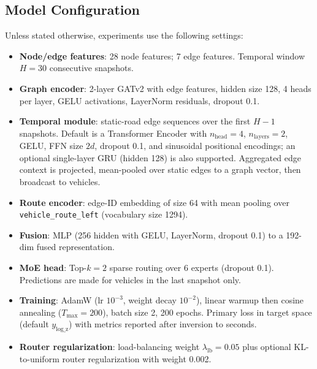 \subsection{Model Configuration}
Unless stated otherwise, experiments use the following settings:
\begin{itemize}
    \item \textbf{Node/edge features}: 28 node features; 7 edge features. Temporal window $H{=}30$ consecutive snapshots.
    \item \textbf{Graph encoder}: 2-layer GATv2 with edge features, hidden size 128, 4 heads per layer, GELU activations, LayerNorm residuals, dropout 0.1.
    \item \textbf{Temporal module}: static-road edge sequences over the first $H{-}1$ snapshots. Default is a Transformer Encoder with $n_\text{head}{=}4$, $n_\text{layers}{=}2$, GELU, FFN size $2d$, dropout 0.1, and sinusoidal positional encodings; an optional single-layer GRU (hidden 128) is also supported. Aggregated edge context is projected, mean-pooled over static edges to a graph vector, then broadcast to vehicles.
    \item \textbf{Route encoder}: edge-ID embedding of size 64 with mean pooling over \texttt{vehicle\_route\_left} (vocabulary size 1294).
    \item \textbf{Fusion}: MLP  (256 hidden with GELU, LayerNorm, dropout 0.1) to a 192-dim fused representation.
    \item \textbf{MoE head}: Top-$k{=}2$ sparse routing over $6$ experts (dropout 0.1). Predictions are made for vehicles in the last snapshot only.
    \item \textbf{Training}: AdamW (lr $10^{-3}$, weight decay $10^{-2}$), linear warmup then cosine annealing ($T_{\text{max}}{=}200$), batch size 2, 200 epochs. Primary loss in target space (default $y_{\text{log\_z}}$) with metrics reported after inversion to seconds.
    \item \textbf{Router regularization}: load-balancing weight $\lambda_\text{lb}{=}0.05$ plus optional KL-to-uniform router regularization with weight 0.002.
\end{itemize}
